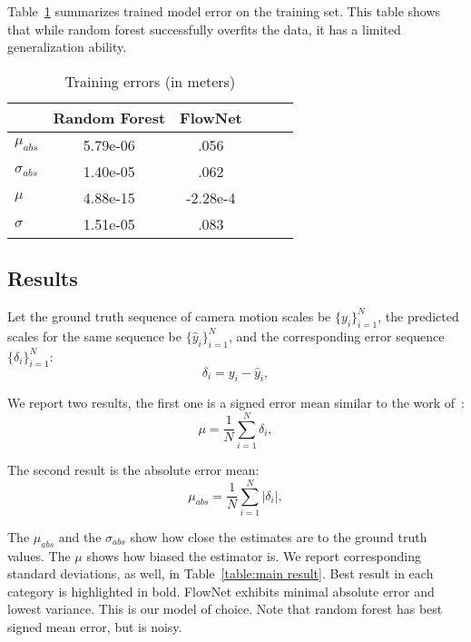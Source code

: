 Table~\ref{table:train result} summarizes trained model error on the
training set.  This table shows that while random forest successfully
overfits the data, it has a limited generalization ability.

\begin{table}[ht]
  \centering
  \begin{tabular}{ lccccc }
    \hline
                       & Random Forest  & FlowNet       \\
    \hline
    $\mu_{abs}$        & 5.79e-06       & .056          \\
    $\sigma_{abs}$     & 1.40e-05       & .062          \\
    $\mu$              & 4.88e-15       & -2.28e-4      \\
    $\sigma$           & 1.51e-05       & .083          \\
    \hline
  \end{tabular}
  \caption{Training errors (in meters)}
  \label{table:train result}
\end{table}

\subsection{Results}\label{sec:results}

Let the ground truth sequence of camera motion scales be
$\{y_i\}_{i=1}^N$, the predicted scales for the same sequence be
$\{\hat{y}_i\}_{i=1}^N$, and the corresponding error sequence
$\{\delta_i\}_{i=1}^N$:
\begin{equation}
  \delta_i = y_i-\hat{y}_i,
\end{equation}

We report two results, the first one is a signed error mean similar to
the work of~\cite{frost2017using}:
\begin{equation}
  \mu = \frac{1}{N}\sum_{i=1}^N{\delta_i},
\end{equation}

The second result is the absolute error mean:
\begin{equation}
  \mu_{abs} = \frac{1}{N}\sum_{i=1}^N{|\delta_i|},
\end{equation}

The $\mu_{abs}$ and the $\sigma_{abs}$ show how close the estimates
are to the ground truth values.  The $\mu$ shows how biased the
estimator is.  We report corresponding standard deviations, as well,
in Table~\ref{table:main result}.  Best result in each category is
highlighted in bold.  FlowNet exhibits minimal absolute error and
lowest variance.  This is our model of choice.  Note that random
forest has best signed mean error, but is noisy.


